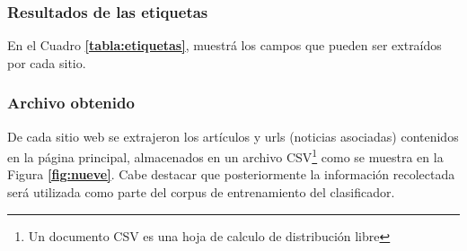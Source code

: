 \subsubsection{Resultados de las etiquetas}
En el Cuadro \textbf{\ref{tabla:etiquetas}}, muestrá los campos que pueden ser extraídos por cada sitio.
\begin{table}[htbp]
  \centering
\caption{Etiquetas extraídos de cada sitio web}
\label{tabla:etiquetas}
\end{table}

\subsubsection{Archivo obtenido}
De cada sitio web se extrajeron los artículos y urls (noticias asociadas) contenidos en la página principal, 
almacenados en un archivo CSV\footnote{Un documento CSV es una hoja de calculo de distribución libre} como se muestra 
en la Figura \textbf{\ref{fig:nueve}}. Cabe destacar que posteriormente la información recolectada será utilizada 
como parte del corpus de entrenamiento del clasificador.

